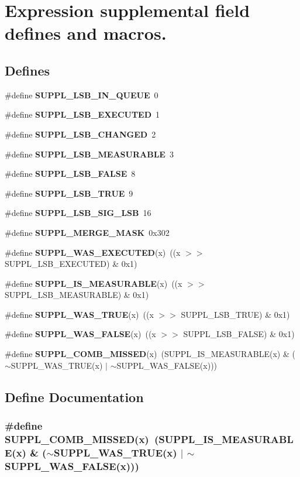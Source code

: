 \section{Expression supplemental field defines and macros.}
\label{group__expr__suppl}
\subsection*{Defines}
\begin{CompactItemize}
\item 
\#define {\bf SUPPL\_\-LSB\_\-IN\_\-QUEUE}\ 0
\item 
\#define {\bf SUPPL\_\-LSB\_\-EXECUTED}\ 1
\item 
\#define {\bf SUPPL\_\-LSB\_\-CHANGED}\ 2
\item 
\#define {\bf SUPPL\_\-LSB\_\-MEASURABLE}\ 3
\item 
\#define {\bf SUPPL\_\-LSB\_\-FALSE}\ 8
\item 
\#define {\bf SUPPL\_\-LSB\_\-TRUE}\ 9
\item 
\#define {\bf SUPPL\_\-LSB\_\-SIG\_\-LSB}\ 16
\item 
\#define {\bf SUPPL\_\-MERGE\_\-MASK}\ 0x302
\item 
\#define {\bf SUPPL\_\-WAS\_\-EXECUTED}(x)\ ((x $>$$>$ SUPPL\_\-LSB\_\-EXECUTED) \& 0x1)
\item 
\#define {\bf SUPPL\_\-IS\_\-MEASURABLE}(x)\ ((x $>$$>$ SUPPL\_\-LSB\_\-MEASURABLE) \& 0x1)
\item 
\#define {\bf SUPPL\_\-WAS\_\-TRUE}(x)\ ((x $>$$>$ SUPPL\_\-LSB\_\-TRUE) \& 0x1)
\item 
\#define {\bf SUPPL\_\-WAS\_\-FALSE}(x)\ ((x $>$$>$ SUPPL\_\-LSB\_\-FALSE) \& 0x1)
\item 
\#define {\bf SUPPL\_\-COMB\_\-MISSED}(x)\ (SUPPL\_\-IS\_\-MEASURABLE(x) \& ($\sim$SUPPL\_\-WAS\_\-TRUE(x) $|$ $\sim$SUPPL\_\-WAS\_\-FALSE(x)))
\end{CompactItemize}


\subsection{Define Documentation}
\subsubsection{\setlength{\rightskip}{0pt plus 5cm}\#define SUPPL\_\-COMB\_\-MISSED(x)\ (SUPPL\_\-IS\_\-MEASURABLE(x) \& ($\sim$SUPPL\_\-WAS\_\-TRUE(x) $|$ $\sim$SUPPL\_\-WAS\_\-FALSE(x)))}\label{group__expr__suppl_a12}


